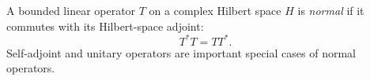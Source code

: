 
A bounded linear operator $T$ on a complex Hilbert space $H$ is \emph{normal} if it commutes with its Hilbert-space adjoint:
\[
T^*T=TT^*.
\]
Self-adjoint and unitary operators are important special cases of normal operators.
